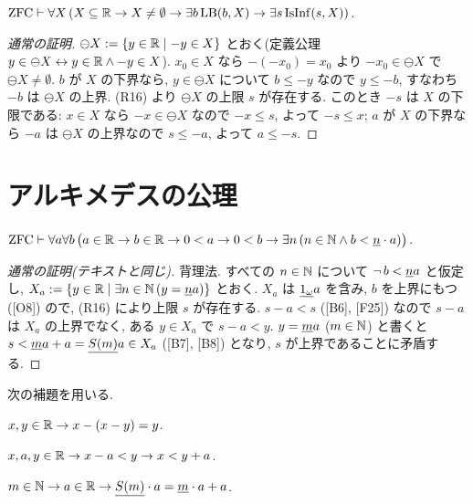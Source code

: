 \begin{thm}[テキスト公理3.1(2)]\label{thm:inf}
  $\mathrm{ZFC} \vdash \forall X\,(X \subseteq \mathbb{R} \to X \neq \emptyset \to \exists b\,\mathrm{LB}(b, X) \to \exists s\,\mathrm{IsInf}(s, X))$.
\end{thm}
\begin{proof}[通常の証明]
  $\ominus X := \{y \in \mathbb{R} \mid -y \in X\}$ とおく(定義公理 $y \in \ominus X \leftrightarrow y \in \mathbb{R} \land -y \in X$). $x_0 \in X$ なら $-(-x_0) = x_0$ より $-x_0 \in \ominus X$ で $\ominus X \neq \emptyset$. $b$ が $X$ の下界なら, $y \in \ominus X$ について $b \leq -y$ なので $y \leq -b$, すなわち $-b$ は $\ominus X$ の上界. (R16) より $\ominus X$ の上限 $s$ が存在する. このとき $-s$ は $X$ の下限である: $x \in X$ なら $-x \in \ominus X$ なので $-x \leq s$, よって $-s \leq x$; $a$ が $X$ の下界なら $-a$ は $\ominus X$ の上界なので $s \leq -a$, よって $a \leq -s$.
\end{proof}

\section{アルキメデスの公理}

\begin{thm}\label{thm:archimedes}
  $\mathrm{ZFC} \vdash \forall a\forall b\,\bigl(a \in \mathbb{R} \to b \in \mathbb{R} \to 0 < a \to 0 < b \to \exists n\,(n \in \mathbb{N} \land b < \underline{n} \cdot a)\bigr)$.
\end{thm}
\begin{proof}[通常の証明(テキストと同じ)]
  背理法. すべての $n \in \mathbb{N}$ について $\neg\, b < \underline{n} a$ と仮定し, $X_a := \{y \in \mathbb{R} \mid \exists n \in \mathbb{N}\,(y = \underline{n} a)\}$ とおく. $X_a$ は $\underline{1_\omega} a$ を含み, $b$ を上界にもつ([O8]) ので, (R16) により上限 $s$ が存在する. $s - a < s$ ([B6], [F25]) なので $s - a$ は $X_a$ の上界でなく, ある $y \in X_a$ で $s - a < y$. $y = \underline{m} a$ ($m \in \mathbb{N}$) と書くと $s < \underline{m} a + a = \underline{S(m)} a \in X_a$ ([B7], [B8]) となり, $s$ が上界であることに矛盾する.
\end{proof}

次の補題を用いる.
\begin{enumerate}[label={[B\arabic*]}, start=6]
  \item $x, y \in \mathbb{R} \to x - (x - y) = y$.
  \item $x, a, y \in \mathbb{R} \to x - a < y \to x < y + a$.
  \item $m \in \mathbb{N} \to a \in \mathbb{R} \to \underline{S(m)} \cdot a = \underline{m} \cdot a + a$.
\end{enumerate}

